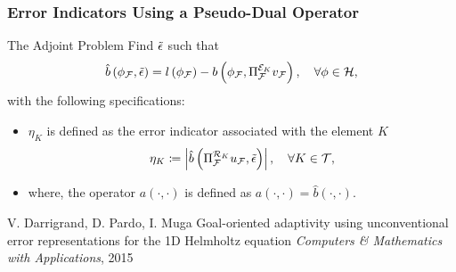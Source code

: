 \begin{frame}
\frametitle{Error Indicators Using a Pseudo-Dual Operator}
    \begin{block}{The Adjoint Problem}
        Find $\tilde{\epsilon}$ such that
      \begin{equation}
         \hat{b}\left(\phi_{\mathcal{F}},\tilde{\epsilon}\right)=l\left(\phi_{\mathcal{F}}\right) - b\left(\phi_{\mathcal{F}},\Pi_{\mathcal{F}}^{\mathcal{E}_K} v_{\mathcal{F}}\right), \quad \forall \phi \in \mathcal{H},
        \label{eq:forward_e}
      \end{equation}
        with the following specifications:
        \begin{itemize}
            \item $\eta_K$ is defined as the error indicator associated with the element $K$
             \begin{equation}
        		\eta_K \coloneqq \left|\hat{b}\left(\Pi_{\mathcal{F}}^{\mathcal{R}_K} u_{\mathcal{F}}, \tilde{\epsilon}\right)\right|, \quad \forall K \in \mathcal{T},
       		\label{eq:1DGOAupperbound}
     	   \end{equation}
            \item where, the operator $a\left(\cdot ,\cdot\right)$ is defined as $a\left(\cdot ,\cdot\right) = \hat{b}\left(\cdot ,\cdot\right)$.
        \end{itemize}
    \end{block}     
    \begin{thebibliography}{}
    \beamertemplatearticlebibitems
		V. Darrigrand, D. Pardo, I. Muga
		\newblock Goal-oriented adaptivity using unconventional error representations for the 1D Helmholtz equation
		\newblock \emph{Computers \& Mathematics with Applications}, 2015
    \end{thebibliography}
\end{frame}